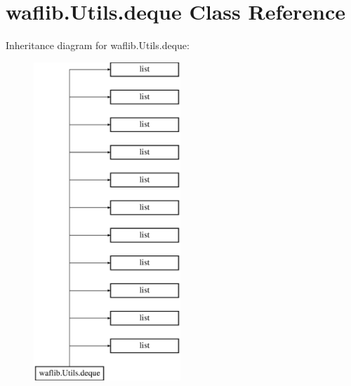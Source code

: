 \hypertarget{classwaflib_1_1_utils_1_1deque}{}\section{waflib.\+Utils.\+deque Class Reference}
\label{classwaflib_1_1_utils_1_1deque}
Inheritance diagram for waflib.\+Utils.\+deque\+:\begin{figure}[H]
\begin{center}
\leavevmode
\includegraphics[height=12.000000cm]{classwaflib_1_1_utils_1_1deque}
\end{center}
\end{figure}
